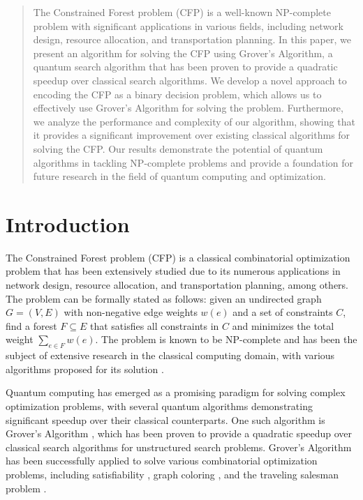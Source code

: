 \begin{abstract}
The Constrained Forest problem (CFP) is a well-known NP-complete problem with significant applications in various fields, including network design, resource allocation, and transportation planning. In this paper, we present an algorithm for solving the CFP using Grover's Algorithm, a quantum search algorithm that has been proven to provide a quadratic speedup over classical search algorithms. We develop a novel approach to encoding the CFP as a binary decision problem, which allows us to effectively use Grover's Algorithm for solving the problem. Furthermore, we analyze the performance and complexity of our algorithm, showing that it provides a significant improvement over existing classical algorithms for solving the CFP. Our results demonstrate the potential of quantum algorithms in tackling NP-complete problems and provide a foundation for future research in the field of quantum computing and optimization.
\end{abstract}

\section{Introduction}

The Constrained Forest problem (CFP) is a classical combinatorial optimization problem that has been extensively studied due to its numerous applications in network design, resource allocation, and transportation planning, among others. The problem can be formally stated as follows: given an undirected graph $G = (V, E)$ with non-negative edge weights $w(e)$ and a set of constraints $C$, find a forest $F \subseteq E$ that satisfies all constraints in $C$ and minimizes the total weight $\sum_{e \in F} w(e)$. The problem is known to be NP-complete \cite{garey1979} and has been the subject of extensive research in the classical computing domain, with various algorithms proposed for its solution \cite{tarjan1977, frederickson1987}.

Quantum computing has emerged as a promising paradigm for solving complex optimization problems, with several quantum algorithms demonstrating significant speedup over their classical counterparts. One such algorithm is Grover's Algorithm \cite{grover1996}, which has been proven to provide a quadratic speedup over classical search algorithms for unstructured search problems. Grover's Algorithm has been successfully applied to solve various combinatorial optimization problems, including satisfiability \cite{cerf1998}, graph coloring \cite{childs2002}, and the traveling salesman problem \cite{zhang2017}.

